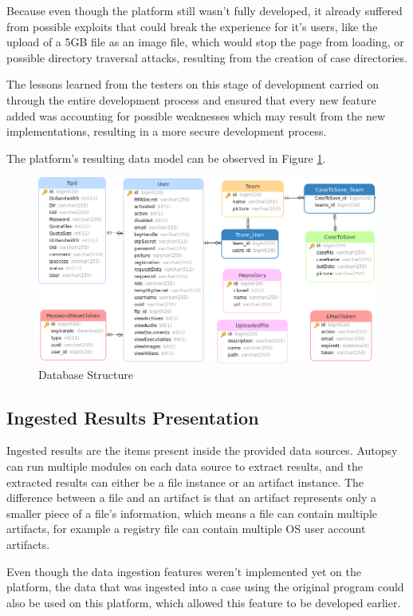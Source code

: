 Because even though the platform still wasn't fully developed, it already suffered from possible exploits that could break the experience for it's users, like the upload of a 5GB file
as an image file, which would stop the page from loading, or possible directory traversal attacks, resulting from the creation of case directories.

The lessons learned from the testers on this stage of development carried on through the entire development process and ensured that every new feature added was accounting for possible weaknesses which may result from the new 
implementations, resulting in a more secure development process.

The platform's resulting data model can be observed in Figure \ref{fig:database}.

\begin{figure}[ht]
 \centering
 \includegraphics[width=1\linewidth]{imgs/database.png}
 \caption{Database Structure}
 \label{fig:database}
\end{figure}

\subsection{Ingested Results Presentation}

Ingested results are the items present inside the provided data sources. Autopsy can run multiple modules on each data source to extract results, and the extracted results can either be a file instance or an artifact instance.
The difference between a file and an artifact is that an artifact represents only a smaller piece of a file's information, which means a file can contain multiple artifacts, for example a registry file can contain multiple OS user account artifacts.

Even though the data ingestion features weren't implemented yet on the platform, the data that was ingested into a case using the original program could also be used on this platform, which allowed this feature to be developed earlier.

